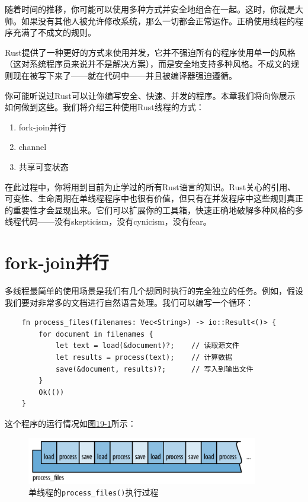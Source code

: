 随着时间的推移，你可能可以使用多种方式并安全地组合在一起。这时，你就是大师。如果没有其他人被允许修改系统，那么一切都会正常运作。正确使用线程的程序充满了不成文的规则。

Rust提供了一种更好的方式来使用并发，它并不强迫所有的程序使用单一的风格（这对系统程序员来说并不是解决方案），而是安全地支持多种风格。不成文的规则现在被写下来了——就在代码中——并且被编译器强迫遵循。

你可能听说过Rust可以让你编写安全、快速、并发的程序。本章我们将向你展示如何做到这些。我们将介绍三种使用Rust线程的方式：
\begin{enumerate}
    \item fork-join并行
    \item channel
    \item 共享可变状态
\end{enumerate}

在此过程中，你将用到目前为止学过的所有Rust语言的知识。Rust关心的引用、可变性、生命周期在单线程程序中也很有价值，但只有在并发程序中这些规则真正的重要性才会显现出来。它们可以扩展你的工具箱，快速正确地破解多种风格的多线程代码——没有skepticism，没有cynicism，没有fear。

\section{fork-join并行}
多线程最简单的使用场景是我们有几个想同时执行的完全独立的任务。例如，假设我们要对非常多的文档进行自然语言处理。我们可以编写一个循环：
\begin{verbatim}
    fn process_files(filenames: Vec<String>) -> io::Result<()> {
        for document in filenames {
            let text = load(&document)?;    // 读取源文件
            let results = process(text);    // 计算数据
            save(&document, results)?;      // 写入到输出文件
        }
        Ok(())
    }
\end{verbatim}

这个程序的运行情况如\hyperref[f19-1]{图19-1}所示：

\begin{figure}[htbp]
    \centering
    \includegraphics[width=0.9\textwidth]{../img/f19-1.png}
    \caption{单线程的\texttt{process\_files()}执行过程}
    \label{f19-1}
\end{figure}

